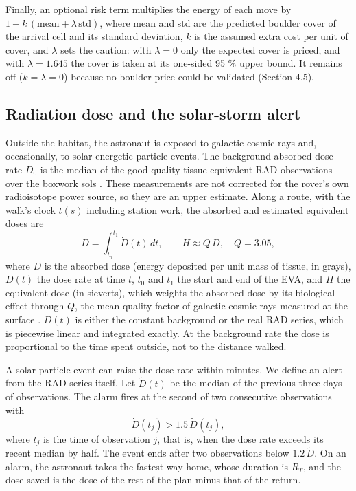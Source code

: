 \documentclass[11pt,a4paper]{article}
\begin{document}
Finally, an optional risk term multiplies the energy of each move by $1 + k\,(\text{mean} + \lambda\,\text{std})$, where mean and std are the predicted boulder cover of the arrival cell and its standard deviation, $k$ is the assumed extra cost per unit of cover, and $\lambda$ sets the caution: with $\lambda = 0$ only the expected cover is priced, and with $\lambda = 1.645$ the cover is taken at its one-sided 95 \% upper bound. It remains off ($k = \lambda = 0$) because no boulder price could be validated (Section 4.5).

\subsection{Radiation dose and the solar-storm alert}

Outside the habitat, the astronaut is exposed to galactic cosmic rays and, occasionally, to solar energetic particle events. The background absorbed-dose rate $\dot D_0$ is the median of the good-quality tissue-equivalent RAD observations over the boxwork sols \cite{RAD-L2}. These measurements are not corrected for the rover's own radioisotope power source, so they are an upper estimate. Along a route, with the walk's clock $t(s)$ including station work, the absorbed and estimated equivalent doses are \[D = \int_{t_0}^{t_1} \dot D(t)\,dt,\qquad H \approx Q\,D,\quad Q = 3.05,\] where $D$ is the absorbed dose (energy deposited per unit mass of tissue, in grays), $\dot D(t)$ the dose rate at time $t$, $t_0$ and $t_1$ the start and end of the EVA, and $H$ the equivalent dose (in sieverts), which weights the absorbed dose by its biological effect through $Q$, the mean quality factor of galactic cosmic rays measured at the surface \cite{Hassler2014}. $\dot D(t)$ is either the constant background or the real RAD series, which is piecewise linear and integrated exactly. At the background rate the dose is proportional to the time spent outside, not to the distance walked.

A solar particle event can raise the dose rate within minutes. We define an alert from the RAD series itself. Let $\tilde D(t)$ be the median of the previous three days of observations. The alarm fires at the second of two consecutive observations with \[\dot D(t_j) > 1.5\,\tilde D(t_j),\] where $t_j$ is the time of observation $j$, that is, when the dose rate exceeds its recent median by half. The event ends after two observations below $1.2\,\tilde D$. On an alarm, the astronaut takes the fastest way home, whose duration is $R_T$, and the dose saved is the dose of the rest of the plan minus that of the return.
\end{document}
